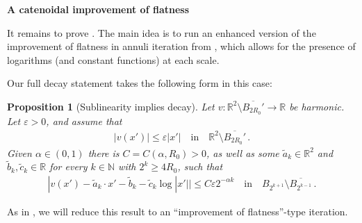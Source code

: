 \documentclass{article}
\newcommand{\N}{\mathbb{N}}
\newcommand{\R}{\mathbb{R}}
\newcommand{\ep}{\varepsilon}
\newtheorem{proposition}[theorem]{Proposition}
\theoremstyle{definition}
\begin{document}
{\bf A catenoidal improvement of flatness}

It remains to prove . The main idea is to run an enhanced version of the improvement of flatness in annuli iteration from , which allows for the presence of logarithms (and constant functions) at each scale.


Our full decay statement takes the following form in this case:
\begin{proposition}[Sublinearity implies decay]\label{prop:dec2B}
Let $v:\R^2\setminus \overline{B_{2 R_0}'}\to\R$ be harmonic. Let $\ep>0$, and assume that
\begin{align*}
    |v(x')|\leq \ep |x'|\quad\mbox{in}\quad \R^2\setminus \overline{B_{2R_0}'}\,.
\end{align*}
Given $\alpha\in(0,1)$ there is $C=C(\alpha,R_0)>0$, as well as some $\widetilde a_k\in\R^2$ and $\widetilde b_k, \widetilde c_k\in\R$ for every $k\in\N$ with $2^k\geq 4R_0$, such that
\begin{align*}
    |v(x')-\widetilde a_k\cdot x'-\widetilde b_k-\widetilde c_k \log|x'||\leq C\ep 2^{ -\alpha k}\quad\mbox{in}\quad B_{2^{k+1}}\setminus \overline{B_{2^{k-1}}}\,.
\end{align*}
\end{proposition}
As in , we will reduce this result to an ``improvement of flatness''-type iteration.
\end{document}
